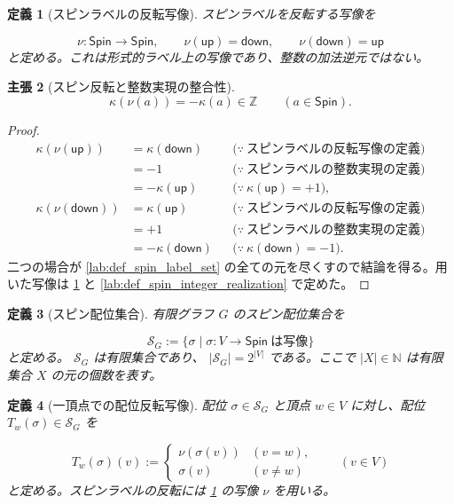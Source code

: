 \documentclass[11pt,a4paper]{article}
\newtheorem{definition}{定義}[section]
\newtheorem{claim}[definition]{主張}
\theoremstyle{remark}
\begin{document}
\begin{definition}[スピンラベルの反転写像]\label{lab:def_spin_label_reversal}
スピンラベルを反転する写像を

\[\nu:\mathsf{Spin}\to\mathsf{Spin},\qquad
\nu(\mathsf{up})=\mathsf{down},\qquad
\nu(\mathsf{down})=\mathsf{up}\]
と定める。これは形式的ラベル上の写像であり、整数の加法逆元ではない。

\end{definition}

\begin{claim}[スピン反転と整数実現の整合性]\label{lab:claim_spin_reversal_integer_realization}
\[\kappa(\nu(a))=-\kappa(a)\in\mathbb Z\qquad(a\in\mathsf{Spin}).\]
\end{claim}
\begin{proof}
\[\begin{aligned}
\kappa(\nu(\mathsf{up}))
&=\kappa(\mathsf{down})
&&\bigl(\because\ \text{スピンラベルの反転写像の定義}\bigr)\\
&=-1
&&\bigl(\because\ \text{スピンラベルの整数実現の定義}\bigr)\\
&=-\kappa(\mathsf{up})
&&\bigl(\because\ \kappa(\mathsf{up})=+1\bigr),\\[4pt]
\kappa(\nu(\mathsf{down}))
&=\kappa(\mathsf{up})
&&\bigl(\because\ \text{スピンラベルの反転写像の定義}\bigr)\\
&=+1
&&\bigl(\because\ \text{スピンラベルの整数実現の定義}\bigr)\\
&=-\kappa(\mathsf{down})
&&\bigl(\because\ \kappa(\mathsf{down})=-1\bigr).
\end{aligned}\]
二つの場合が 
\cref{lab:def_spin_label_set}
 の全ての元を尽くすので結論を得る。用いた写像は 
\cref{lab:def_spin_label_reversal}
 と 
\cref{lab:def_spin_integer_realization}
 で定めた。

\end{proof}

\begin{definition}[スピン配位集合]\label{lab:def_spin_configuration_set}
有限グラフ 
$G$
 のスピン配位集合を

\[\mathcal S_G:=\{\sigma\mid \sigma:V\to\mathsf{Spin}\ \text{は写像}\}\]
と定める。
$\mathcal S_G$
 は有限集合であり、
$|\mathcal S_G|=2^{|V|}$
 である。ここで 
$|X|\in\mathbb N$
 は有限集合 
$X$
 の元の個数を表す。

\end{definition}

\begin{definition}[一頂点での配位反転写像]\label{lab:def_single_vertex_spin_flip}
配位 
$\sigma\in\mathcal S_G$
 と頂点 
$w\in V$
 に対し、配位 
$T_w(\sigma)\in\mathcal S_G$
 を

\[T_w(\sigma)(v):=
\begin{cases}
\nu(\sigma(v)) & (v=w),\\
\sigma(v) & (v\ne w)
\end{cases}
\qquad(v\in V)\]
と定める。スピンラベルの反転には 
\cref{lab:def_spin_label_reversal}
 の写像 
$\nu$
 を用いる。

\end{definition}
\end{document}
